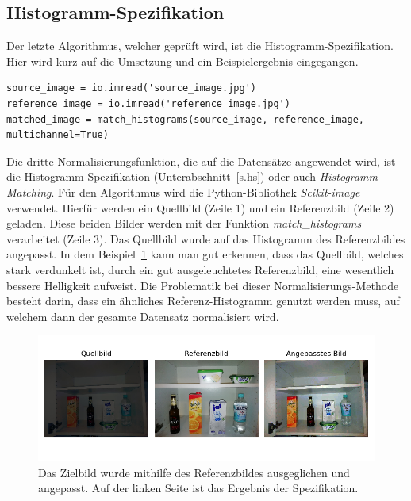 \subsection{Histogramm-Spezifikation}
Der letzte Algorithmus, welcher geprüft wird, ist die Histogramm-Spezifikation. Hier wird kurz auf die Umsetzung und ein Beispielergebnis eingegangen.\\
\begin{lstlisting}
source_image = io.imread('source_image.jpg')
reference_image = io.imread('reference_image.jpg')
matched_image = match_histograms(source_image, reference_image, multichannel=True)
\end{lstlisting}
Die dritte Normalisierungsfunktion, die auf die Datensätze angewendet wird, ist die Histogramm-Spezifikation (Unterabschnitt~\ref{s.hs}) oder auch \textit{Histogramm Matching}. Für den Algorithmus wird die Python-Bibliothek \textit{Scikit-image} verwendet. Hierfür werden ein Quellbild (Zeile 1) und ein Referenzbild (Zeile 2) geladen. Diese beiden Bilder werden mit der Funktion \textit{match\_histograms} verarbeitet (Zeile 3). Das Quellbild wurde auf das Histogramm des Referenzbildes angepasst. In dem Beispiel~\ref{img:histogramspez} kann man gut erkennen, dass das Quellbild, welches stark verdunkelt ist, durch ein gut ausgeleuchtetes Referenzbild, eine wesentlich bessere Helligkeit aufweist. Die Problematik bei dieser Normalisierungs-Methode besteht darin, dass ein ähnliches Referenz-Histogramm genutzt werden muss, auf welchem dann der gesamte Datensatz normalisiert wird.
\begin{figure}
	[h]
	\centering
	\includegraphics[scale=0.6]{Sources/HS_beispiel.png}
	\caption{Das Zielbild wurde mithilfe des Referenzbildes ausgeglichen und angepasst. Auf der linken Seite ist das Ergebnis der Spezifikation.}
	\label{img:histogramspez}
\end{figure}